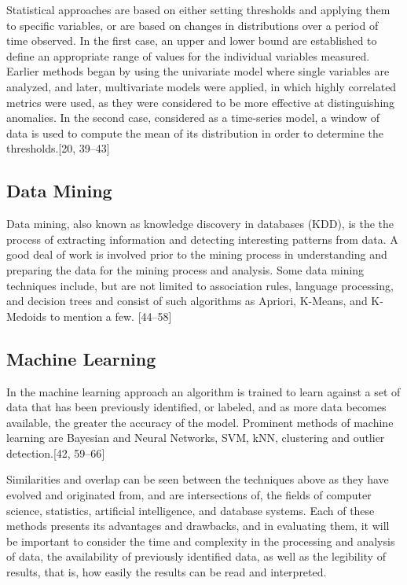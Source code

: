 \documentclass[12pt,]{article}
\begin{document}
Statistical approaches are based on either setting thresholds and
applying them to specific variables, or are based on changes in
distributions over a period of time observed. In the first case, an
upper and lower bound are established to define an appropriate range of
values for the individual variables measured. Earlier methods began by
using the univariate model where single variables are analyzed, and
later, multivariate models were applied, in which highly correlated
metrics were used, as they were considered to be more effective at
distinguishing anomalies. In the second case, considered as a
time-series model, a window of data is used to compute the mean of its
distribution in order to determine the thresholds.{[}20, 39--43{]}

\subsection{Data Mining}\label{data-mining}

Data mining, also known as knowledge discovery in databases (KDD), is
the the process of extracting information and detecting interesting
patterns from data. A good deal of work is involved prior to the mining
process in understanding and preparing the data for the mining process
and analysis. Some data mining techniques include, but are not limited
to association rules, language processing, and decision trees and
consist of such algorithms as Apriori, K-Means, and K-Medoids to mention
a few. {[}44--58{]}

\subsection{Machine Learning}\label{machine-learning}

In the machine learning approach an algorithm is trained to learn
against a set of data that has been previously identified, or labeled,
and as more data becomes available, the greater the accuracy of the
model. Prominent methods of machine learning are Bayesian and Neural
Networks, SVM, kNN, clustering and outlier detection.{[}42, 59--66{]}

Similarities and overlap can be seen between the techniques above as
they have evolved and originated from, and are intersections of, the
fields of computer science, statistics, artificial intelligence, and
database systems. Each of these methods presents its advantages and
drawbacks, and in evaluating them, it will be important to consider the
time and complexity in the processing and analysis of data, the
availability of previously identified data, as well as the legibility of
results, that is, how easily the results can be read and interpreted.
\end{document}

